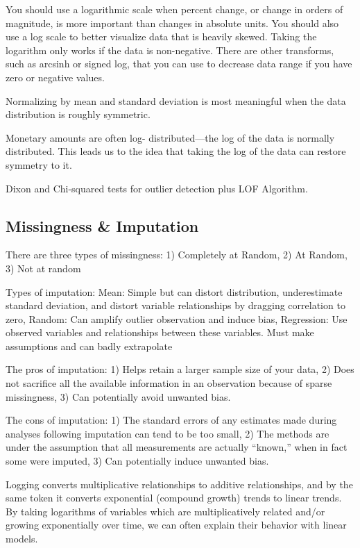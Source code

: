 \documentclass[]{book}
\begin{document}
You should use a logarithmic scale when percent change, or change in orders of magnitude, is more important than changes in absolute units. You should also use a log scale to better visualize data that is heavily skewed. Taking the logarithm only works if the data is non-negative. There are other transforms, such as arcsinh or signed log, that you can use to decrease data range if you have zero or negative values.

Normalizing by mean and standard deviation is most meaningful when the data distribution is roughly symmetric.

Monetary amounts are often log- distributed---the log of the data is normally distributed. This leads us to the idea that taking the log of the data can restore symmetry to it.

Dixon and Chi-squared tests for outlier detection plus LOF Algorithm.

\hypertarget{missingness-imputation}{%
\subsection{Missingness \& Imputation}\label{missingness-imputation}}

There are three types of missingness: 1) Completely at Random, 2) At Random, 3) Not at random

Types of imputation: Mean: Simple but can distort distribution, underestimate standard deviation, and distort variable relationships by dragging correlation to zero, Random: Can amplify outlier observation and induce bias, Regression: Use observed variables and relationships between these variables. Must make assumptions and can badly extrapolate

The pros of imputation: 1) Helps retain a larger sample size of your data, 2) Does not sacrifice all the available information in an observation because of sparse missingness, 3) Can potentially avoid unwanted bias.

The cons of imputation: 1) The standard errors of any estimates made during analyses following imputation can tend to be too small, 2) The methods are under the assumption that all measurements are actually ``known,'' when in fact some were imputed, 3) Can potentially induce unwanted bias.

Logging converts multiplicative relationships to additive relationships, and by the same token it converts exponential (compound growth) trends to linear trends. By taking logarithms of variables which are multiplicatively related and/or growing exponentially over time, we can often explain their behavior with linear models.
\end{document}
